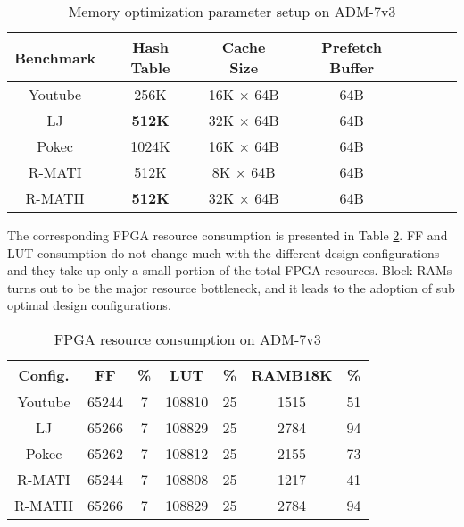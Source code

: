 \begin{table}
	\vspace{-0.3em}
	\caption{Memory optimization parameter setup on ADM-7v3}
	\label{tab:parameter-setup}
	\centering
	\vspace{-0.3em}
	\begin{tabular}{ccccccc}
		\toprule
		Benchmark & Hash Table & Cache Size & Prefetch Buffer \\
		\midrule
		Youtube  & 256K  & 16K $\times$ 64B & 64B \\
		LJ       & \textbf{512K} & 32K $\times$ 64B & 64B \\
		Pokec    & 1024K & 16K $\times$ 64B & 64B \\
		R-MATI   & 512K  & 8K $\times$  64B & 64B \\
		R-MATII  & \textbf{512K} & 32K $\times$ 64B & 64B \\
		\bottomrule
	\end{tabular}
	\vspace{-1em}
\end{table}



The corresponding FPGA resource consumption is 
presented in Table \ref{tab:mem-resource}. 
FF and LUT consumption do not change much with the different 
design configurations and they take up only a small portion 
of the total FPGA resources. Block RAMs turns out to be the major 
resource bottleneck, and it leads to the adoption of sub optimal 
design configurations.



\begin{table}
	\vspace{-0.5em}
	\caption{FPGA resource consumption on ADM-7v3}
	\label{tab:mem-resource}
	\vspace{-0.3em}
	\centering
	\begin{tabular}{ccccccc}
		\toprule
		Config. & FF & \% & LUT & \% & RAMB18K & \% \\
		\midrule
		Youtube  & 65244 & 7 & 108810 & 25 & 1515  & 51 \\
		LJ       & 65266 & 7 & 108829 & 25 & 2784  & 94 \\
		Pokec    & 65262 & 7 & 108812 & 25 & 2155 & 73 \\
		R-MATI   & 65244 & 7 & 108808 & 25 & 1217 & 41 \\
		R-MATII  & 65266 & 7 & 108829 & 25 & 2784 & 94 \\
		\bottomrule
	\end{tabular}
	\vspace{-1em}
\end{table}



